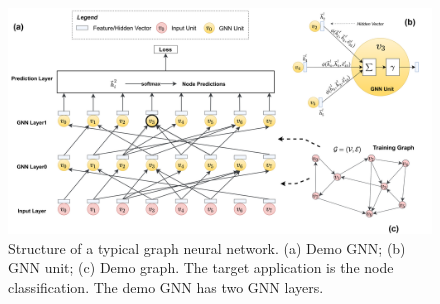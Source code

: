 \begin{figure}
	\centering
	\includegraphics[width=0.95\columnwidth]{figs/illustration/GNN_common_architecture.png}
	\caption{Structure of a typical graph neural network. (a) Demo GNN; (b) GNN unit; (c) Demo graph. The target application is the node classification. The demo GNN has two GNN layers.}
	\label{fig:general_structure_of_gnn}
\end{figure}
